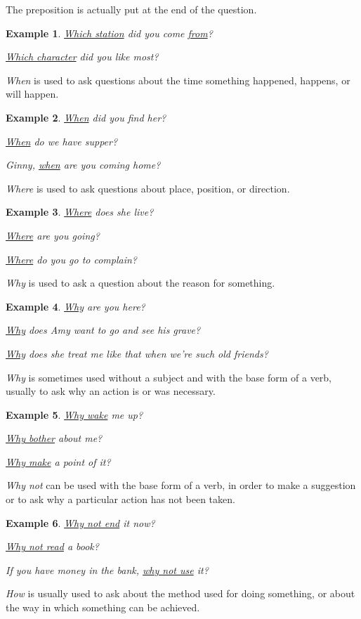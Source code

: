\documentclass[oneside]{book}
\numberwithin{equation}{section}
\newtheorem{example}{Example}[section]
\begin{document}
The preposition is actually put at the end of the question.
\begin{example}
    \underline{Which station} did you come \underline{from}?
    
    \underline{Which character} did you like most?
\end{example}
%
\noindent{} \textit{When} is used to ask questions about the time something happened, happens, or will happen.
\begin{example}
    \underline{When} did you find her?
    
    \underline{When} do we have supper?
    
    Ginny, \underline{when} are you coming home?
\end{example}
\textit{Where} is used to ask questions about place, position, or direction.
\begin{example}
    \underline{Where} does she live?
    
    \underline{Where} are you going?
    
    \underline{Where} do you go to complain?
\end{example}
%
\noindent{} \textit{Why} is used to ask a question about the reason for something.
\begin{example}
    \underline{Why} are you here?
    
    \underline{Why} does Amy want to go and see his grave?
    
    \underline{Why} does she treat me like that when we're such old friends?
\end{example}
\textit{Why} is sometimes used without a subject and with the base form of a verb, usually to ask why an action is or was necessary.
\begin{example}
    \underline{Why wake} me up?
    
    \underline{Why bother} about me?
    
    \underline{Why make} a point of it?
\end{example}
\textit{Why not} can be used with the base form of a verb, in order to make a suggestion or to ask why a particular action has not been taken.
\begin{example}
    \underline{Why not end} it now?
    
    \underline{Why not read} a book?
    
    If you have money in the bank, \underline{why not use} it?
\end{example}
%
\noindent{} \textit{How} is usually used to ask about the method used for doing something, or about the way in which something can be achieved.
\end{document}
